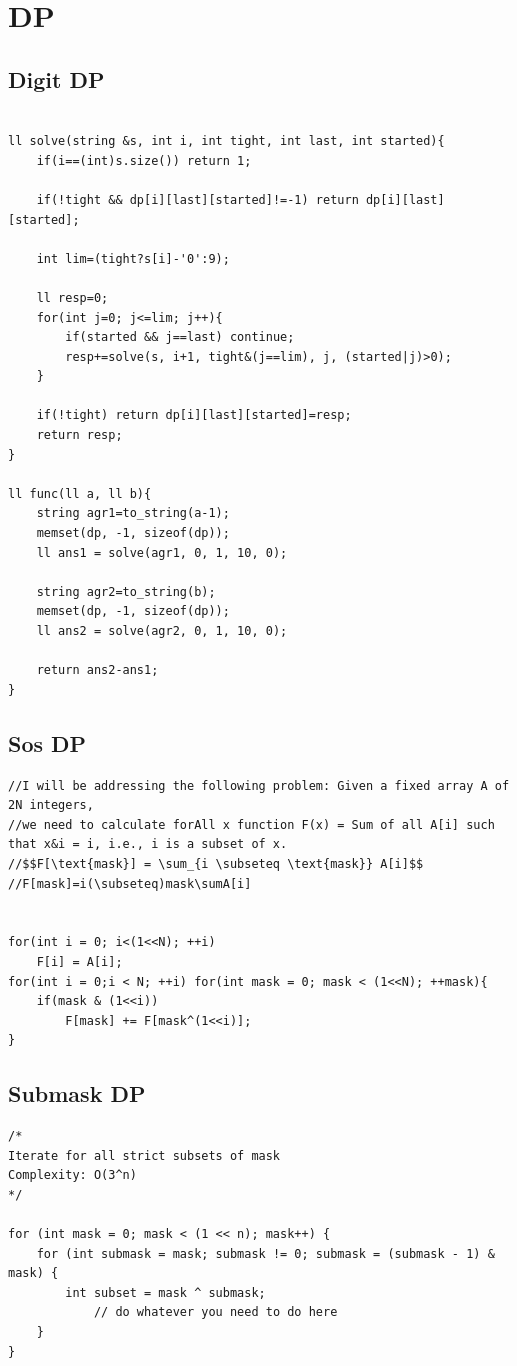 \documentclass[11pt, a4paper, twoside]{article}
\begin{document}
%
%

\section{DP}

\subsection{Digit DP}
\begin{verbatim}

ll solve(string &s, int i, int tight, int last, int started){ 
    if(i==(int)s.size()) return 1;
    
    if(!tight && dp[i][last][started]!=-1) return dp[i][last][started];
    
    int lim=(tight?s[i]-'0':9);
    
    ll resp=0;
    for(int j=0; j<=lim; j++){
        if(started && j==last) continue;
        resp+=solve(s, i+1, tight&(j==lim), j, (started|j)>0);
    }
    
    if(!tight) return dp[i][last][started]=resp;
    return resp;
}

ll func(ll a, ll b){
    string agr1=to_string(a-1);
    memset(dp, -1, sizeof(dp));
    ll ans1 = solve(agr1, 0, 1, 10, 0);
    
    string agr2=to_string(b);
    memset(dp, -1, sizeof(dp));
    ll ans2 = solve(agr2, 0, 1, 10, 0);
        
    return ans2-ans1;
}
\end{verbatim}

\subsection{Sos DP}
\begin{verbatim}
//I will be addressing the following problem: Given a fixed array A of 2N integers,
//we need to calculate forAll x function F(x) = Sum of all A[i] such that x&i = i, i.e., i is a subset of x.
//$$F[\text{mask}] = \sum_{i \subseteq \text{mask}} A[i]$$
//F[mask]=i(\subseteq)mask\sumA[i]


for(int i = 0; i<(1<<N); ++i)
	F[i] = A[i];
for(int i = 0;i < N; ++i) for(int mask = 0; mask < (1<<N); ++mask){
	if(mask & (1<<i))
		F[mask] += F[mask^(1<<i)];
}
\end{verbatim}

\subsection{Submask DP}
\begin{verbatim}
/*
Iterate for all strict subsets of mask
Complexity: O(3^n)
*/

for (int mask = 0; mask < (1 << n); mask++) {
    for (int submask = mask; submask != 0; submask = (submask - 1) & mask) {
        int subset = mask ^ submask;
            // do whatever you need to do here
    }
}

\end{verbatim}
\end{document}
